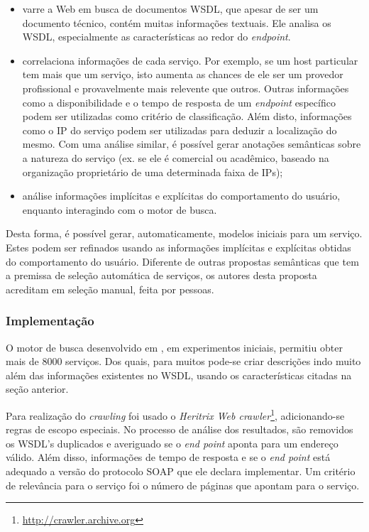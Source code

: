 \begin{itemize}
	\item varre a Web em busca de documentos WSDL, que apesar de ser um documento técnico, contém muitas informações textuais. Ele analisa os WSDL, especialmente as características ao redor do \textit{endpoint}.
  \item correlaciona informações de cada serviço. Por exemplo, se um host particular tem mais que um serviço, isto aumenta as chances de ele ser um provedor profissional e provavelmente mais relevente que outros. Outras informações como a disponibilidade e o tempo de resposta de um \textit{endpoint} específico podem ser utilizadas como critério de classificação. Além disto, informações como o IP do serviço podem ser utilizadas para deduzir a localização do mesmo. Com uma análise similar, é possível gerar anotações semânticas sobre a natureza do serviço (ex. se ele é comercial ou acadêmico, baseado na organização proprietário de uma determinada faixa de IPs);
  \item análise informações implícitas e explícitas do comportamento do usuário, enquanto interagindo com o motor de busca.
\end{itemize}

Desta forma, é possível gerar, automaticamente, modelos iniciais para um serviço. Estes podem ser refinados usando as informações implícitas e explícitas obtidas do comportamento do usuário. Diferente de outras propostas semânticas que tem a premissa de seleção automática de serviços, os autores desta proposta acreditam em seleção manual, feita por pessoas.

\subsubsection{Implementação}

O motor de busca desenvolvido em \cite{lausen2007finding}, em experimentos iniciais, permitiu obter mais de 8000 serviços. Dos quais, para muitos pode-se criar descrições indo muito além das informações existentes no WSDL, usando os características citadas na seção anterior.

Para realização do \textit{crawling} foi usado o \textit{Heritrix Web crawler}\footnote{\url{http://crawler.archive.org}}, adicionando-se regras de escopo especiais.
No processo de análise dos resultados, são removidos os WSDL's duplicados e averiguado se o \textit{end point} aponta para um endereço válido. Além disso, informações de tempo de resposta e se o \textit{end point} está adequado a versão do protocolo SOAP que ele declara implementar. Um critério de relevância para o serviço foi o número de páginas que apontam para o serviço.

